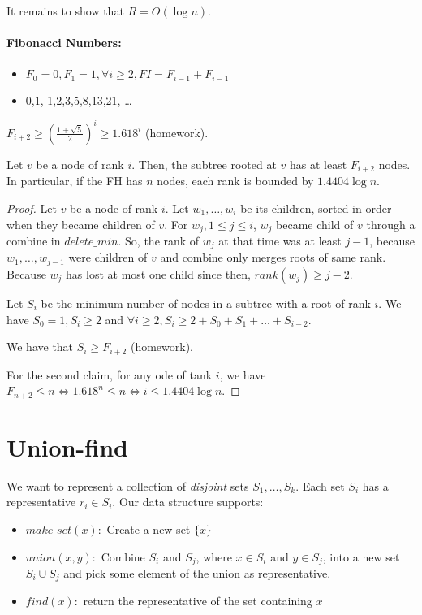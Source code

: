 It remains to show that $R = O(\log n)$.

\paragraph{Fibonacci Numbers:}
\begin{itemize}
\item $F_0 = 0, F_1 = 1, \forall i \ge 2, FI = F_{i-1} + F_{i - 1}$
\item 0,1, 1,2,3,5,8,13,21, \ldots
\end{itemize}

\begin{mylemma}
$F_{i + 2} \ge \left ( \frac{1 + \sqrt{5}}{2} \right )^i \ge 1.618^i$ (homework).
\end{mylemma}

\begin{mylemma}
Let $v$ be a node of rank $i$. Then, the subtree rooted at $v$ has at least $F_{i+2}$ nodes. In particular, if the FH has $n$ nodes, each rank is bounded by $1.4404 \log n$.
\end{mylemma}
\begin{proof}
Let $v$ be a node of rank $i$. Let $w_1, \ldots, w_i$ be its children, sorted in order when they became children of $v$. For $w_j, 1 \le j \le i$, $w_j$ became child of $v$ through a combine in ${delete\_min}$. So, the rank of $w_j$ at that time was at least $j - 1$, because $w_1, \ldots, w_{j-1}$ were children of $v$ and combine only merges roots of same rank. Because $w_j$ has lost at most one child since then, ${rank}(w_j) \ge j-2$.

Let $S_i$ be the minimum number of nodes in a subtree with a root of rank $i$. We have $S_0 = 1, S_i \ge 2$ and $\forall i \ge 2, S_i \ge 2 + S_0 + S_1 + \ldots + S_{i-2}$.

We have that $S_i \ge F_{i+2}$ (homework).

For the second claim, for any ode of tank $i$, we have $F_{n+2} \le n \iff 1.618^n \le n \iff i \le 1.4404 \log n$.
\end{proof}

\section{Union-find}

We want to represent a collection of \emph{disjoint} sets $S_1, \ldots, S_k$. Each set $S_i$ has a representative $r_i \in S_i$. Our data structure supports:

\begin{itemize}
\item ${make\_set}(x):$ Create a new set $\{x\}$
\item ${union}(x, y):$ Combine $S_i$ and $S_j$, where $x \in S_i$ and $y \in S_j$, into a new set $S_i \cup S_j$ and pick some element of the union as representative.
\item ${find}(x):$ return the representative of the set containing $x$
\end{itemize}
 
